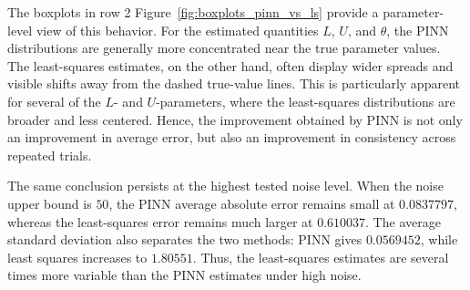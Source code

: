 \documentclass[11pt]{article}
\begin{document}
The boxplots in row 2 Figure~\ref{fig:boxplots_pinn_vs_ls} provide a parameter-level view of this behavior. For the estimated quantities \(L\), \(U\), and \(\theta\), the PINN distributions are generally more concentrated near the true parameter values. The least-squares estimates, on the other hand, often display wider spreads and visible shifts away from the dashed true-value lines. This is particularly apparent for several of the \(L\)- and \(U\)-parameters, where the least-squares distributions are broader and less centered. Hence, the improvement obtained by PINN is not only an improvement in average error, but also an improvement in consistency across repeated trials.



The same conclusion persists at the highest tested noise level. When the noise upper bound is \(50\), the PINN average absolute error remains small at \(0.0837797\), whereas the least-squares error remains much larger at \(0.610037\). The average standard deviation also separates the two methods: PINN gives \(0.0569452\), while least squares increases to \(1.80551\). Thus, the least-squares estimates are several times more variable than the PINN estimates under high noise.
\end{document}
